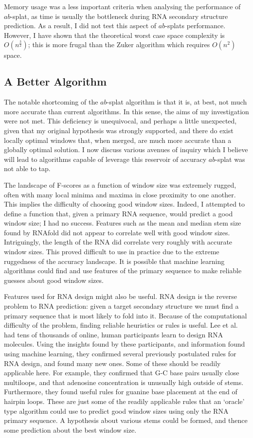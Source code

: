 \documentclass{cshonours}
\begin{document}
Memory usage was a less important criteria when analysing the performance of $ab$-splat, as time is usually the bottleneck during RNA secondary structure prediction. As a result, I did not test this aspect of $ab$-splats performance. However, I have shown that the theoretical worst case space complexity is $O(n^\frac{3}{2})$; this is more frugal than the Zuker algorithm which requires $O(n^2)$ space.

\subsection{A Better Algorithm}

The notable shortcoming of the $ab$-splat algorithm is that it is, at best, not much more accurate than current algorithms. In this sense, the aims of my investigation were not met. This deficiency is unequivocal, and perhaps a little unexpected, given that my original hypothesis was strongly supported, and there do exist locally optimal windows that, when merged, are much more accurate than a globally optimal solution. I now discuss various avenues of inquiry which I believe will lead to algorithms capable of leverage this reservoir of accuracy $ab$-splat was not able to tap.

The landscape of F-scores as a function of window size was extremely rugged, often with many local minima and maxima in close proximity to one another. This implies the difficulty of choosing good window sizes. Indeed, I attempted to define a function that, given a primary RNA sequence, would predict a good window size; I had no success. Features such as the mean and median stem size found by RNAfold did not appear to correlate well with good window sizes. Intriguingly, the length of the RNA did correlate very roughly with accurate window sizes. This proved difficult to use in practice due to the extreme ruggedness of the accuracy landscape. It is possible that machine learning algorithms could find and use features of the primary sequence to make reliable guesses about good window sizes. 

Features used for RNA design might also be useful. RNA design is the reverse problem to RNA prediction: given a target secondary structure we must find a primary sequence that is most likely to fold into it. Because of the computational difficulty of the problem, finding reliable heuristics or rules is useful. Lee et al. \cite{lee2014rna} had tens of thousands of online, human participants learn to design RNA molecules. Using the insights found by these participants, and information found using machine learning, they confirmed several previously postulated rules for RNA design, and found many new ones. Some of these should be readily applicable here. For example, they confirmed that G-C base pairs usually close multiloops, and that adenosine concentration is unusually high outside of stems. Furthermore, they found useful rules for guanine base placement at the end of hairpin loops. These are just some of the readily applicable rules that an `oracle' type algorithm could use to predict good window sizes using only the RNA primary sequence. A hypothesis about various stems could be formed, and thence some prediction about the best window size.
\end{document}
